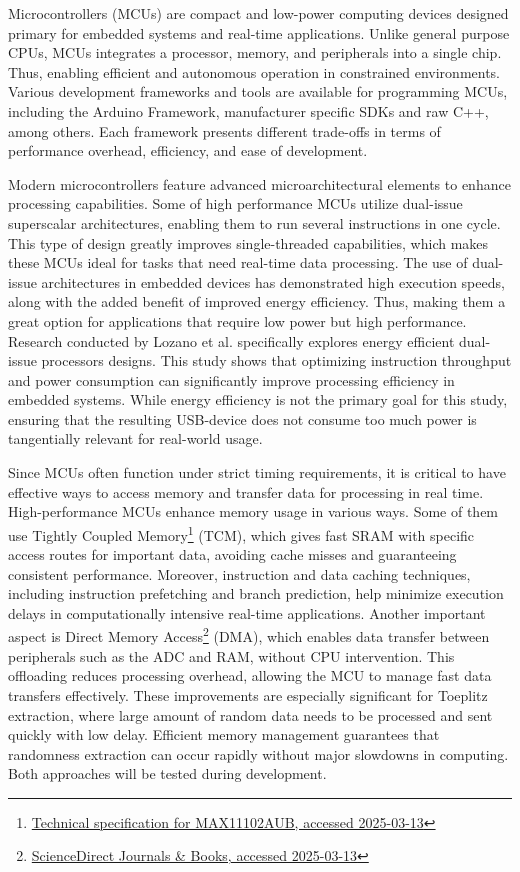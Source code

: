 Microcontrollers (MCUs) are compact and low-power computing devices designed primary for embedded systems and real-time applications. Unlike general purpose CPUs, MCUs integrates a processor, memory, and peripherals into a single chip. Thus, enabling efficient and autonomous operation in constrained environments. Various development frameworks and tools are available for programming MCUs, including the Arduino Framework, manufacturer specific SDKs and raw C++, among others. Each framework presents different trade-offs in terms of performance overhead, efficiency, and ease of development.

Modern microcontrollers feature advanced microarchitectural elements to enhance processing capabilities. Some of high performance MCUs utilize dual-issue superscalar architectures, enabling them to run several instructions in one cycle. This type of design greatly improves single-threaded capabilities, which makes these MCUs ideal for tasks that need real-time data processing. The use of dual-issue architectures in embedded devices has demonstrated high execution speeds, along with the added benefit of improved energy efficiency. Thus, making them a great option for applications that require low power but high performance. Research conducted by Lozano et al. \cite{dual-issue} specifically explores energy efficient dual-issue processors designs. This study shows that optimizing instruction throughput and power consumption can significantly improve processing efficiency in embedded systems. While energy efficiency is not the primary goal for this study, ensuring that the resulting USB-device does not consume too much power is tangentially relevant for real-world usage.

Since MCUs often function under strict timing requirements, it is critical to have effective ways to access memory and transfer data for processing in real time. High-performance MCUs enhance memory usage in various ways. Some of them use Tightly Coupled Memory\footnote{\href{https://www.farnell.com/datasheets/1913106.pdf}{Technical specification for MAX11102AUB, accessed 2025-03-13}} (TCM), which gives fast SRAM with specific access routes for important data, avoiding cache misses and guaranteeing consistent performance. Moreover, instruction and data caching techniques, including instruction prefetching and branch prediction, help minimize execution delays in computationally intensive real-time applications. Another important aspect is Direct Memory Access\footnote{\href{https://www.sciencedirect.com/topics/computer-science/direct-memory-access}{ScienceDirect Journals \& Books, accessed 2025-03-13}} (DMA), which enables data transfer between peripherals such as the ADC and RAM, without CPU intervention. This offloading reduces processing overhead, allowing the MCU to manage fast data transfers effectively. These improvements are especially significant for Toeplitz extraction, where large amount of random data needs to be processed and sent quickly with low delay. Efficient memory management guarantees that randomness extraction can occur rapidly without major slowdowns in computing. Both approaches will be tested during development.

